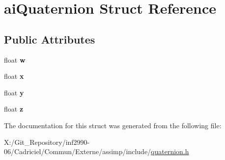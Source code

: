 \hypertarget{structai_quaternion}{\section{ai\-Quaternion Struct Reference}
\label{structai_quaternion}
}
\subsection*{Public Attributes}
\begin{DoxyCompactItemize}
\item 
\hypertarget{structai_quaternion_a410b3c46417d67d728a01a5810907a36}{float {\bfseries w}}\label{structai_quaternion_a410b3c46417d67d728a01a5810907a36}

\item 
\hypertarget{structai_quaternion_af9db21b086c14d8654d62005f740e75f}{float {\bfseries x}}\label{structai_quaternion_af9db21b086c14d8654d62005f740e75f}

\item 
\hypertarget{structai_quaternion_a1695fefbc60becf95fcafcc08573ab44}{float {\bfseries y}}\label{structai_quaternion_a1695fefbc60becf95fcafcc08573ab44}

\item 
\hypertarget{structai_quaternion_acc30da6103d5131fb1bed6640f1eeda0}{float {\bfseries z}}\label{structai_quaternion_acc30da6103d5131fb1bed6640f1eeda0}

\end{DoxyCompactItemize}


The documentation for this struct was generated from the following file\-:\begin{DoxyCompactItemize}
\item 
X\-:/\-Git\-\_\-\-Repository/inf2990-\/06/\-Cadriciel/\-Commun/\-Externe/assimp/include/\hyperlink{quaternion_8h}{quaternion.\-h}\end{DoxyCompactItemize}
